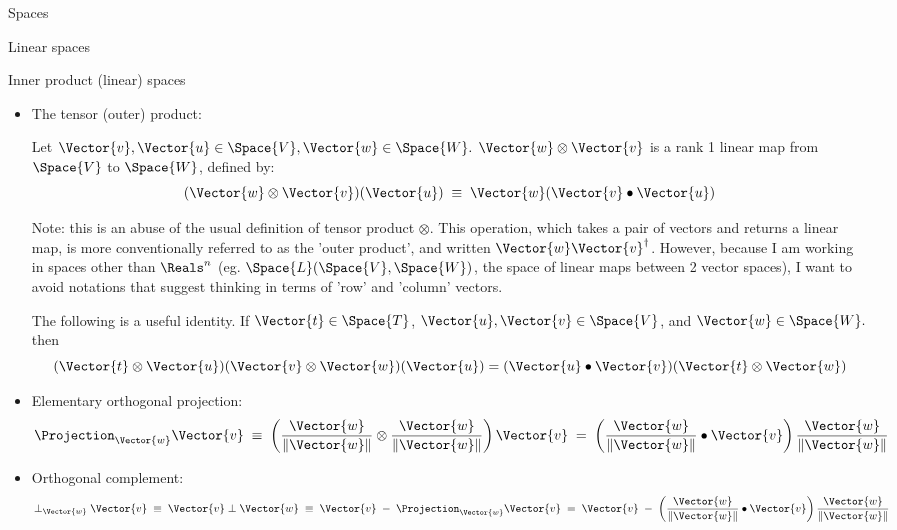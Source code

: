\begin{plSection}{Spaces}
\begin{plSection}{Linear spaces}
\begin{plSection}{Inner product (linear) spaces}
\begin{itemize}
\item The tensor (outer) product:

Let $\Vector{v}, \Vector{u} \in \Space{V}, \Vector{w} \in \Space{W}.$
$\Vector{w} \otimes \Vector{v}$ is a rank 1 linear map
from $\Space{V}$ to $\Space{W}$, defined by:
\begin{equation}
(\Vector{w} \otimes \Vector{v})
(\Vector{u}) \; \equiv \; \Vector{w} 
(\Vector{v} \bullet \Vector{u})
\end{equation}

Note: this is an abuse of the usual definition of tensor product $\otimes$.
This operation, which takes a pair of vectors and returns a linear map,
is more conventionally referred to as the 'outer product',
and written $\Vector{w} \Vector{v}^{\dagger}$.
However, because I am working in spaces other than $\Reals^n$
(eg. $\Space{L}(\Space{V},\Space{W})$, the space of linear maps
between 2 vector spaces),
I want to avoid notations that suggest thinking in terms
of 'row' and 'column' vectors.

The following is a useful identity.
If $\Vector{t} \in \Space{T}$, 
$\Vector{u}, \Vector{v} \in \Space{V}$, 
and $\Vector{w} \in \Space{W}.$
then
\begin{equation}
\label{eq:tensor-dot}
(\Vector{t} \otimes \Vector{u}) 
(\Vector{v} \otimes \Vector{w})(\Vector{u}) 
= (\Vector{u} \bullet \Vector{v}) (\Vector{t} \otimes \Vector{w})
\end{equation}

\item Elementary orthogonal projection:
\begin{equation}
\Projection_{\Vector{w}} \Vector{v}
\; \equiv \;
\left( \frac{ \Vector{w} }{ \| \Vector{w} \| } \otimes 
\frac{ \Vector{w} }{ \| \Vector{w} \| } \right) \Vector{v}
\; = \;
\left(
\frac{\Vector{w} }{\|\Vector{w}\|} \bullet \Vector{v} 
\right) 
\frac{\Vector{w}}{\|\Vector{w}\|}
\end{equation}

\item Orthogonal complement:
\begin{equation}
\perp_{\Vector{w}} \Vector{v}
\; \equiv \;
\Vector{v} \perp \Vector{w}
\; \equiv \;
\Vector{v} \; - \; \Projection_{\Vector{w}} \Vector{v}
\; = \;
\Vector{v} \; - \; 
\left( 
\frac{\Vector{w}}{\|\Vector{w}\|} \bullet \Vector{v} 
\right) 
\frac{\Vector{w}}{\|\Vector{w}\|}
\end{equation}


\end{itemize}
\end{plSection}
\end{plSection}
\end{plSection}
